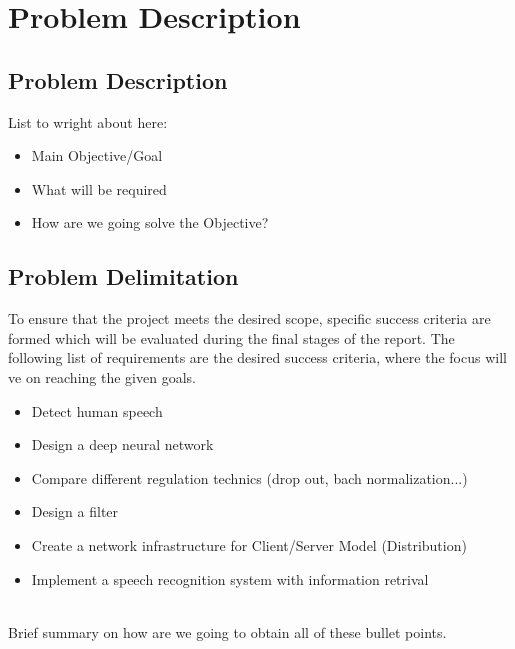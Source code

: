 \chapter{Problem Description}\label{ch:problem_description}

\section{Problem Description}
List to wright about here:

\begin{itemize}
  \item Main Objective/Goal
  \item What will be required
  \item How are we going solve the Objective?
\end{itemize}
\section{Problem Delimitation}
To ensure that the project meets the desired scope, specific success criteria are formed which will be evaluated during the final stages of the report. The following list of requirements are the desired success criteria, where the focus will ve on reaching the given goals.

\begin{itemize}
  \item Detect human speech
  \item Design a deep neural network
  \item Compare different regulation technics (drop out, bach normalization...)
  \item Design a filter
  \item Create a network infrastructure for Client/Server Model (Distribution)
  \item Implement a speech recognition system with information retrival
\end{itemize}
\ \\
Brief summary on how are we going to obtain all of these bullet points.
